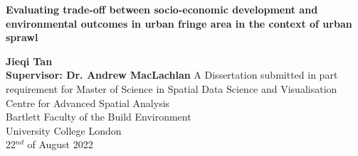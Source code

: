 \documentclass[12pt]{report}
\author{the author}
\numberwithin{figure}{section}
\numberwithin{table}{section}
\begin{document}
\begin{titlepage}
\begin{center}
    \vspace*{1cm}
    
    \vfill %
    
    {\Large\textbf{Evaluating trade-off between socio-economic development and environmental outcomes in urban fringe area in the context of urban sprawl\\
    }}
    \vspace*{1cm}
    \vspace{0.8cm}
    \vspace{0.8cm}

    {\Large\textbf{Jieqi Tan\\}}
    \vspace{1.5cm}
    {\large\textbf{Supervisor: Dr. Andrew MacLachlan}}
   \vspace{1.5cm}
    \vfill
    {
    A Dissertation submitted in part requirement for Master of Science in Spatial Data Science and Visualisation\\
    \vspace{1cm}
    Centre for Advanced Spatial Analysis\\
    Bartlett Faculty of the Build Environment\\
    University College London\\
    \vspace{2cm}
    22$^{nd}$ of August 2022}

    \vspace{2cm}
\end{center}
\end{titlepage}


\tableofcontents 



\newpage 
\listoffigures%
\end{document}
